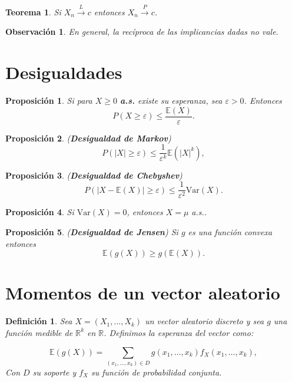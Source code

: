 \documentclass{report}
\newtheorem{thm}{Teorema}[section]
\newtheorem{prop}{Proposición}[section]
\newtheorem{dfn}{Definición}[section]
\newtheorem{obs}{Observación}[section]
\begin{document}
\begin{thm} \label{thm:conv_law_to_prob}
Si $X_n \xrightarrow{L} c$ entonces $X_n \xrightarrow{P} c$.
\end{thm}

\begin{obs}
    En general, la recíproca de las implicancias dadas no vale.
\end{obs}

\section{Desigualdades}
\begin{prop}
    Si para $X \geq 0$ \textbf{a.s.} existe su esperanza, sea $\varepsilon > 0$. Entonces
\[
P(X \geq \varepsilon) \leq \frac{\mathbb{E}(X)}{\varepsilon}. 
\]
\end{prop}

\begin{prop} \label{prop:markov} (\textbf{Desigualdad de Markov})
\[
P(|X| \geq \varepsilon) \leq \frac{1}{\varepsilon^k} \mathbb{E}(|X|^k), 
\]
\end{prop}

\begin{prop} \label{prop:chebyshev} (\textbf{Desigualdad de Chebyshev})
\[
P(|X - \mathbb{E}(X)| \geq \varepsilon) \leq \frac{1}{\varepsilon^2} \mathrm{Var}(X).
\]
\end{prop}

\begin{prop} \label{prop:variance_zero}
Si $\mathrm{Var}(X) = 0$, entonces $X = \mu$ a.s..
\end{prop}

\begin{prop} \label{prop:jensen} (\textbf{Desigualdad de Jensen}) Si $g$ es una función convexa entonces
\[
\mathbb{E}(g(X)) \geq g(\mathbb{E}(X)).
\]
\end{prop}

\section{Momentos de un vector aleatorio}
\begin{dfn} \label{dfn:expected_value_vector}
Sea $X = (X_1, \dots, X_k)$ un vector aleatorio discreto y sea $g$ una función medible de $\mathbb{R}^k$ en $\mathbb{R}$. 
Definimos la esperanza del vector como:


\[
\mathbb{E}(g(X)) = \sum_{(x_1,\dots,x_k) \in D} g(x_1,\dots,x_k)f_X(x_1,\dots,x_k),
\]
Con $D$ su soporte y $f_X$ su función de probabilidad conjunta.
\end{dfn}
\end{document}
